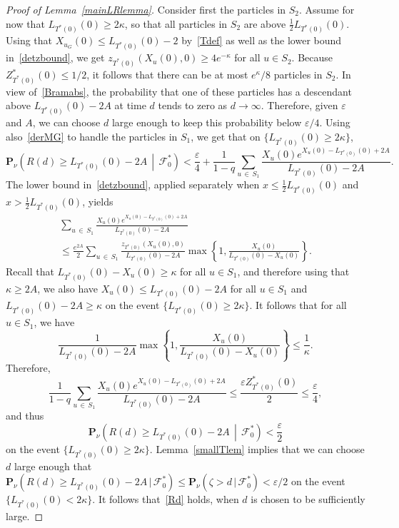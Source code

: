 \documentclass[10pt]{amsart}
\theoremstyle{definition}\newtheorem{defi}[theo]{Definition}\newtheorem{rema}[theo]{Remark}\newtheorem{exam}[theo]{Example}\newtheorem{exem}[theo]{Example}\newtheorem{nota}[theo]{Notation}
\newcommand*\eps{\varepsilon}
\renewcommand*\P{\mathbf{P}}
\newcommand\F{\mathcal{F}}
\newcommand{\1} {\mathds{1}}
\begin{document}
\begin{proof}[Proof of Lemma~\ref{mainLRlemma}]
Consider first the particles in $S_2$. Assume for now that $L_{T^*(0)}(0) \geq 2 \kappa$, so that all particles in $S_2$ are above $\frac{1}{2} L_{T^*(0)}(0)$. Using that $X_{u_G}(0) \leq L_{T^*(0)}(0) - 2$ by~\eqref{Tdef} as well as the lower bound in~\eqref{detzbound}, we get $z_{T^*(0)}(X_u(0), 0) \geq 4 e^{-\kappa}$ for all $u \in S_2$. Because $Z^*_{T^*(0)}(0) \leq 1/2$, it follows that there can be at most $e^{\kappa}/8$ particles in $S_2$. In view of~\eqref{Bramabs}, the probability that one of these particles has a descendant above $L_{T^*(0)}(0) - 2A$ at time $d$ tends to zero as $d \rightarrow \infty$. Therefore, given $\eps$ and $A$, we can choose $d$ large enough to keep this probability below $\eps/4$. Using also~\eqref{derMG} to handle the particles in $S_1$, we get that on $\{L_{T^*(0)}(0) \geq 2 \kappa\}$,
\[
\P_{\nu}\left(R(d) \geq L_{T^*(0)}(0) - 2A\,\middle|\,\F^*_0\right) < \frac{\eps}{4} + \frac{1}{1-q} \sum_{u\,\in\,S_1} \frac{X_u(0) e^{X_u(0) - L_{T^*(0)}(0) + 2A}}{L_{T^*(0)}(0) - 2A}.
\]
The lower bound in~\eqref{detzbound}, applied separately when $x \leq \frac{1}{2} L_{T^*(0)}(0)$ and $x > \frac{1}{2}L_{T^*(0)}(0)$, yields
\begin{multline*}
\sum_{u\,\in\,S_1} \frac{X_u(0) e^{X_u(0) - L_{T^*(0)}(0) + 2A}}{L_{T^*(0)}(0) - 2A} \\
\leq \frac{e^{2A}}{2} \sum_{u\,\in\,S_1} \frac{z_{T^*(0)}(X_u(0), 0)}{L_{T^*(0)}(0) - 2A} \max \left\{1, \frac{X_u(0)}{L_{T^*(0)}(0) - X_u(0)} \right\}.
\end{multline*}
Recall that $L_{T^*(0)}(0) - X_u(0) \geq \kappa$ for all $u \in S_1$, and therefore using that $\kappa \geq 2A$, we also have $X_u(0) \leq L_{T^*(0)}(0) - 2A$ for all $u \in S_1$ and $L_{T^*(0)}(0) - 2A \geq \kappa$ on the event $\{L_{T^*(0)}(0) \geq 2 \kappa\}$. It follows that for all $u \in S_1$, we have
\[
\frac{1}{L_{T^*(0)}(0) - 2A} \max \left\{1, \frac{X_u(0)}{L_{T^*(0)}(0) - X_u(0)} \right\} \leq \frac{1}{\kappa}.
\]
Therefore,
\[
\frac{1}{1-q} \sum_{u\,\in\,S_1} \frac{X_u(0) e^{X_u(0) - L_{T^*(0)}(0) + 2A}}{L_{T^*(0)}(0) - 2A} \leq \frac{\eps Z^*_{T^*(0)}(0)}{2} \leq \frac{\eps}{4},
\]
and thus
\[
\P_{\nu}\left(R(d) \geq L_{T^*(0)}(0) - 2A\,\middle|\, \F^*_0\right) < \frac{\eps}{2}
\]
on the event $\{L_{T^*(0)}(0) \geq 2 \kappa\}$. Lemma~\ref{smallTlem} implies that we can choose $d$ large enough that $\P_{\nu}(R(d) \geq L_{T^*(0)}(0) - 2A\,|\, \F^*_0) \leq \P_{\nu}(\zeta > d\,|\,\F_0^*) < \eps/2$ on the event $\{L_{T^*(0)}(0) < 2 \kappa\}$. It follows that~\eqref{Rd} holds, when $d$ is chosen to be sufficiently large.


\end{proof}
\end{document}
